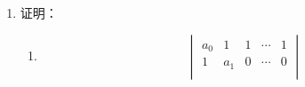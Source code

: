 \begin{enumerate}
\begin{enumerate}
\[\begin{vmatrix}
      x&y&0&\cdots&0&0\\
      0&x&y&\cdots&0&0\\
      \vdots&\vdots&\vdots&&\vdots&\vdots\\
      0&0&0&\cdots&x&y\\
      y&0&0&\cdots&0&x
    \end{vmatrix};
    \]
  \anssub
    \item \[
    \begin{vmatrix}
      a_1-b_1&a_1-b_2&\cdots&a_1-b_n\\
      a_2-b_1&a_2-b_2&\cdots&a_2-b_n\\
      \vdots&\vdots&&\vdots\\
      a_n-b_1&a_n-b_2&\cdots&a_n-b_n
    \end{vmatrix};
    \]
  \anssub
    \item \[
    \begin{vmatrix}
      x_1-m&x_2&\cdots&x_n\\
      x_1&x_2-m&\cdots&x_n\\
      \vdots&\vdots&&\vdots\\
      x_1&x_2&\cdots&x_n-m
    \end{vmatrix};
    \]
  \anssub
    \item \[
    \begin{vmatrix}
      1&2&2&\cdots&2\\
      2&2&2&\cdots&2\\
      2&2&3&\cdots&2\\
      \vdots&\vdots&\vdots&&\vdots\\
      2&2&2&\cdots&n
    \end{vmatrix};
    \]
  \anssub
    \item \[
    \begin{vmatrix}
      1&2&3&\cdots&n-1&n\\
      1&-1&0&\cdots&0&0\\
      0&2&-2&\cdots&0&0\\
      \vdots&\vdots&\vdots&&\vdots&\vdots\\
      0&0&0&\cdots&n-1&1-n
    \end{vmatrix}.
    \]
  \anssub
  \end{enumerate}
  \item 证明：
  \begin{enumerate}
    \item \[
    \begin{vmatrix}
      a_0&1&1&\cdots&1\\
      1&a_1&0&\cdots&0\\

\end{vmatrix}\]
\end{enumerate}
\end{enumerate}
